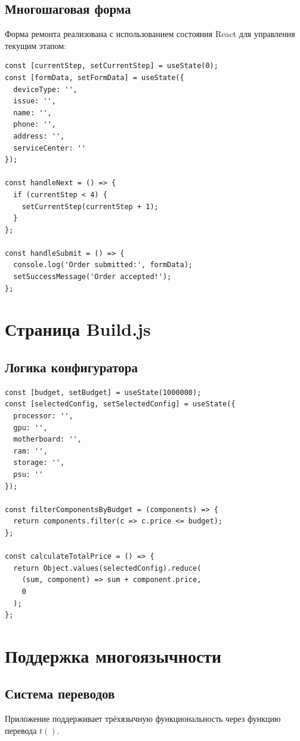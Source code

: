 \documentclass[12pt,a4paper]{report}
\begin{document}
\subsection{Многошаговая форма}
Форма ремонта реализована с использованием состояния React для управления текущим этапом:

\begin{lstlisting}
const [currentStep, setCurrentStep] = useState(0);
const [formData, setFormData] = useState({
  deviceType: '',
  issue: '',
  name: '',
  phone: '',
  address: '',
  serviceCenter: ''
});

const handleNext = () => {
  if (currentStep < 4) {
    setCurrentStep(currentStep + 1);
  }
};

const handleSubmit = () => {
  console.log('Order submitted:', formData);
  setSuccessMessage('Order accepted!');
};
\end{lstlisting}

\section{Страница Build.js}

\subsection{Логика конфигуратора}
\begin{lstlisting}
const [budget, setBudget] = useState(1000000);
const [selectedConfig, setSelectedConfig] = useState({
  processor: '',
  gpu: '',
  motherboard: '',
  ram: '',
  storage: '',
  psu: ''
});

const filterComponentsByBudget = (components) => {
  return components.filter(c => c.price <= budget);
};

const calculateTotalPrice = () => {
  return Object.values(selectedConfig).reduce(
    (sum, component) => sum + component.price,
    0
  );
};
\end{lstlisting}

\section{Поддержка многоязычности}

\subsection{Система переводов}
Приложение поддерживает трёхязычную функциональность через функцию перевода $t()$.
\end{document}
